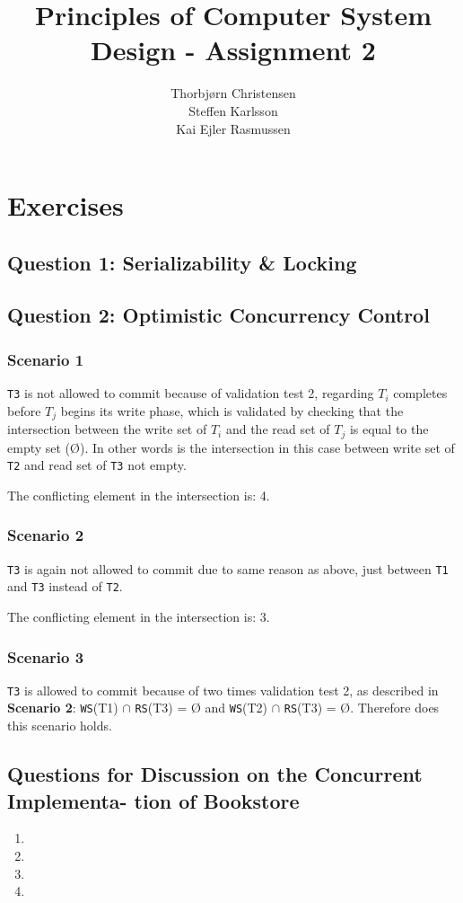 \documentclass[10pt,a4paper]{article}
\author{Thorbjørn Christensen \\
Steffen Karlsson \\
Kai Ejler Rasmussen}
\title{Principles of Computer System Design - Assignment 2}
\begin{document}
\maketitle

\section*{Exercises}
\subsection*{Question 1: Serializability \& Locking}

\subsection*{Question 2: Optimistic Concurrency Control}
\subsubsection*{Scenario 1}
\texttt{T3} is not allowed to commit because of validation test 2, regarding $T_i$ completes before $T_j$ begins its write phase, which is validated by checking that the intersection between the write set of $T_i$ and the read set of $T_j$ is equal to the empty set (Ø). In other words is the intersection in this case between write set of \texttt{T2} and read set of \texttt{T3} not empty.
\newline

The conflicting element in the intersection is: 4.

\subsubsection*{Scenario 2}
\texttt{T3} is again not allowed to commit due to same reason as above, just between \texttt{T1} and \texttt{T3} instead of \texttt{T2}.
\newline

The conflicting element in the intersection is: 3.

\subsubsection*{Scenario 3}
\texttt{T3} is allowed to commit because of two times validation test 2, as described in \textbf{Scenario 2}: \texttt{WS}(T1) $\cap$ \texttt{RS}(T3) = Ø and \texttt{WS}(T2) $\cap$ \texttt{RS}(T3) = Ø. Therefore does this scenario holds.

\subsection*{Questions for Discussion on the Concurrent Implementa- tion of Bookstore}

\begin{enumerate}
	\item
	\item
	\item
	\item
\end{enumerate}
\end{document}
